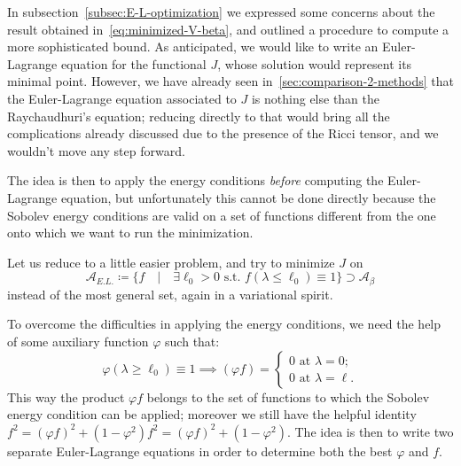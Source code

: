 In subsection~\ref{subsec:E-L-optimization} we expressed some concerns about the result obtained in~\eqref{eq:minimized-V-beta}, and outlined a procedure to compute a more sophisticated bound.
As anticipated, we would like to write an Euler-Lagrange equation for the functional \(J\), whose solution would represent its minimal point.
However, we have already seen in~\ref{sec:comparison-2-methods} that the Euler-Lagrange equation associated to \(J\) is nothing else than the Raychaudhuri's equation; reducing directly to that would bring all the complications already discussed due to the presence of the Ricci tensor, and we wouldn't move any step forward.

The idea is then to apply the energy conditions \emph{before} computing the Euler-Lagrange equation, but unfortunately this cannot be done directly because the Sobolev energy conditions are valid on a set of functions different from the one onto which we want to run the minimization.

Let us reduce to a little easier problem, and try to minimize \(J\) on
\[
\mathcal{A}_{E.L.} \coloneqq \{f \quad \vert \quad \exists \ell_0 > 0 \text{ s.t. } f(\lambda \le \ell_0) \equiv 1\} \supset \mathcal{A}_{\beta}
\]
instead of the most general set, again in a variational spirit.

To overcome the difficulties in applying the energy conditions, we need the help of some auxiliary function \(\varphi\) such that:
\[
\varphi(\lambda \ge \ell_0) \equiv 1 \implies \left(\varphi f\right)   =
\begin{cases}
    0 \text{ at } \lambda = 0;\\
    0 \text{ at } \lambda = \ell.
\end{cases}
\]
This way the product \(\varphi f\) belongs to the set of functions to which the Sobolev energy condition can be applied; moreover we still have the helpful identity \(f^2 = \left(\varphi f\right)^2 + \left(1 - \varphi^2\right) f^2 = \left(\varphi f\right)^2 + \left(1 - \varphi^2\right)\). The idea is then to write two separate Euler-Lagrange equations in order to determine both the best \(\varphi\) and \(f\). 

